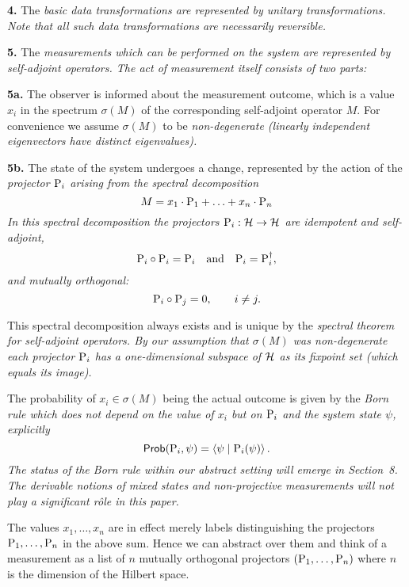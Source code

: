 \documentclass[10pt]{article}
\begin{document}
\ben
\item[{\bf 4.}] The \em basic data transformations \em are represented by unitary
transformations.  Note that all such data transformations are necessarily
\emph{reversible}.
\item[{\bf 5.}] The \em measurements \em which can be performed on the system are
represented by  self-adjoint operators.  
\een
The act of measurement itself consists of two parts:
\bit
\item[{\bf 5a.}] The observer is informed about the measurement outcome,
  which is a value $x_i$ in the spectrum $\sigma(M)$ of
the corresponding self-adjoint operator $M$. For convenience we assume
$\sigma(M)$ to be \em non-degenerate \em (linearly independent eigenvectors
have distinct eigenvalues). 
\item[{\bf 5b.}] The state of the system undergoes a change, represented by
  the action of the \em projector \em ${\rm P}_i$ arising from  the \em spectral decomposition \em 
\[ 
M=x_1\cdot {\rm P}_1+\ldots+x_n\cdot {\rm P}_n
\]
\eit
In this spectral decomposition the projectors ${\rm P}_i:{\cal H}\to{\cal
H}$ are  idempotent and self-adjoint, 
\[ 
{\rm P}_i\circ{\rm P}_i={\rm P}_i\quad {\rm and} \quad{\rm P}_i={\rm
P}_i^\dagger ,
\]
and
mutually orthogonal:
\[ {\rm P}_i\circ{\rm P}_j=0, \qquad  i\not=j . \]

This spectral decomposition always exists and is unique by the
\em spectral theorem \em for self-adjoint operators.  By our assumption
that $\sigma(M)$ was non-degenerate each projector ${\rm P}_i$ has a
one-dimensional subspace of
${\cal H}$ as its fixpoint set (which equals its image).

The probability of $x_i\in\sigma(M)$ being the actual outcome is given
by the \em Born rule \em which does not depend on
the value of $x_i$ but on ${\rm P}_i$ and the system state $\psi$, explicitly 
\[
{\sf Prob}({\rm
P}_i,\psi)=\langle\psi\mid {\rm P}_i(\psi)\rangle\,. 
\]
The
status of the Born rule within our abstract setting will emerge in
Section~8.
The derivable notions of \em mixed states \em and \em non-projective
measurements
\em will not play a significant r\^ole in this paper.

The values $x_1,\ldots,x_n$ are in effect merely labels distinguishing  
the projectors ${\rm P}_1,\ldots,{\rm P}_n$ in the
above sum. Hence we can abstract over them and think of
a measurement as a list of $n$ mutually orthogonal
projectors
$({\rm P}_1,\ldots,{\rm P}_n)$
where $n$ is the dimension of the Hilbert space. 
\end{document}
